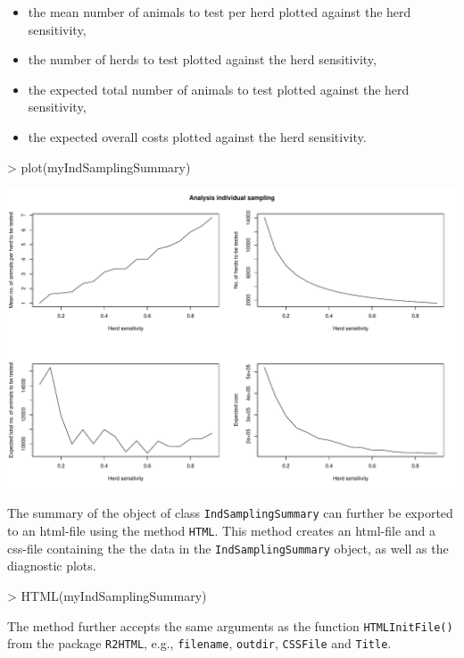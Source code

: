 \documentclass[nojss]{jss}
\begin{document}
\begin{itemize}
\item the mean number of animals to test per herd plotted against the herd sensitivity,
\item the number of herds to test plotted against the herd sensitivity,
\item the expected total number of animals to test plotted against the herd sensitivity,
\item the expected overall costs plotted against the herd sensitivity.
\end{itemize}

\begin{Schunk}
\begin{Sinput}
> plot(myIndSamplingSummary)
\end{Sinput}
\end{Schunk}
\includegraphics{FFD-intro-006}

The summary of the object of class \texttt{IndSamplingSummary} can further be exported to an html-file using the method \texttt{HTML}.  This method creates an html-file and a css-file containing the the data in the \texttt{IndSamplingSummary} object, as well as the diagnostic plots.

\begin{Schunk}
\begin{Sinput}
> HTML(myIndSamplingSummary)
\end{Sinput}
\end{Schunk}

The method further accepts the same arguments as the function \texttt{HTMLInitFile()} from the package \texttt{R2HTML}, e.g., \texttt{filename}, \texttt{outdir}, \texttt{CSSFile} and \texttt{Title}.
\end{document}
